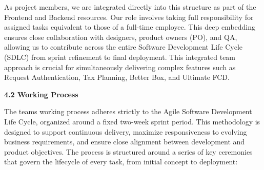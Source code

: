 As project members, we are integrated directly into this structure as
part of the Frontend and Backend resources. Our role involves taking
full responsibility for assigned tasks equivalent to those of a
full-time employee. This deep embedding ensures close collaboration with
designers, product owners (PO), and QA, allowing us to contribute across
the entire Software Development Life Cycle (SDLC) from sprint refinement
to final deployment. This integrated team approach is crucial for
simultaneously delivering complex features such as Request
Authentication, Tax Planning, Better Box, and Ultimate FCD.

\textbf{4.2 Working Process}

The team\textquotesingle s working process adheres strictly to the Agile
Software Development Life Cycle, organized around a fixed two-week
sprint period. This methodology is designed to support continuous
delivery, maximize responsiveness to evolving business requirements, and
ensure close alignment between development and product objectives. The
process is structured around a series of key ceremonies that govern the
lifecycle of every task, from initial concept to deployment:

